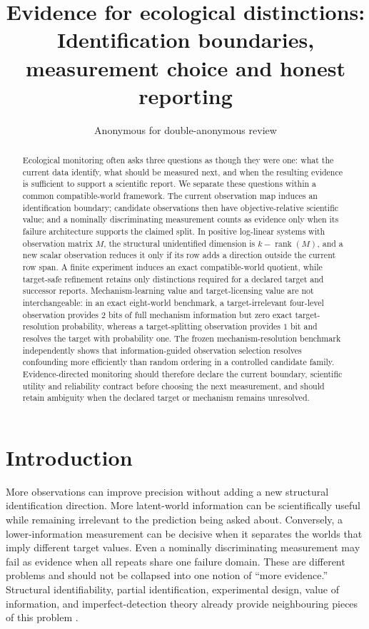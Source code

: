 \documentclass[11pt]{article}
\title{Evidence for ecological distinctions:\\Identification boundaries, measurement choice and honest reporting}
\author{Anonymous for double-anonymous review}
\date{}
\begin{document}
\maketitle

\begin{abstract}
Ecological monitoring often asks three questions as though they were one: what the current data identify, what should be measured next, and when the resulting evidence is sufficient to support a scientific report. We separate these questions within a common compatible-world framework. The current observation map induces an identification boundary; candidate observations then have objective-relative scientific value; and a nominally discriminating measurement counts as evidence only when its failure architecture supports the claimed split. In positive log-linear systems with observation matrix $M$, the structural unidentified dimension is $k-\operatorname{rank}(M)$, and a new scalar observation reduces it only if its row adds a direction outside the current row span. A finite experiment induces an exact compatible-world quotient, while target-safe refinement retains only distinctions required for a declared target and successor reports. Mechanism-learning value and target-licensing value are not interchangeable: in an exact eight-world benchmark, a target-irrelevant four-level observation provides $2$ bits of full mechanism information but zero exact target-resolution probability, whereas a target-splitting observation provides $1$ bit and resolves the target with probability one. The frozen mechanism-resolution benchmark independently shows that information-guided observation selection resolves confounding more efficiently than random ordering in a controlled candidate family. Evidence-directed monitoring should therefore declare the current boundary, scientific utility and reliability contract before choosing the next measurement, and should retain ambiguity when the declared target or mechanism remains unresolved.
\end{abstract}

\section{Introduction}
More observations can improve precision without adding a new structural identification direction. More latent-world information can be scientifically useful while remaining irrelevant to the prediction being asked about. Conversely, a lower-information measurement can be decisive when it separates the worlds that imply different target values. Even a nominally discriminating measurement may fail as evidence when all repeats share one failure domain. These are different problems and should not be collapsed into one notion of ``more evidence.'' Structural identifiability, partial identification, experimental design, value of information, and imperfect-detection theory already provide neighbouring pieces of this problem \cite{BellmanAstrom1970,Rothenberg1971,Manski2003,ChalonerVerdinelli1995,CanessaEtAl2015,MacKenzieEtAl2002}.
\end{document}
